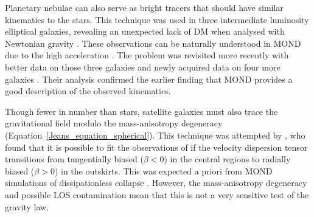 \documentclass[fleqn,usenatbib,useAMS,onecolumn]{mnras} %
\begin{document}
Planetary nebulae can also serve as bright tracers that should have similar kinematics to the stars. This technique was used in three intermediate luminosity elliptical galaxies, revealing an unexpected lack of DM when analysed with Newtonian gravity \citep{Romanowsky_2003}. These observations can be naturally understood in MOND due to the high acceleration \citep{Milgrom_2003}. The problem was revisited more recently with better data on those three galaxies and newly acquired data on four more galaxies \citep{Tian_2016}. Their analysis confirmed the earlier finding that MOND provides a good description of the observed kinematics.

Though fewer in number than stars, satellite galaxies must also trace the gravitational field modulo the mass-anisotropy degeneracy (Equation~\ref{Jeans_equation_spherical}). This technique was attempted by \citet{Angus_2008}, who found that it is possible to fit the observations of \citet{Klypin_2009_SDSS} if the velocity dispersion tensor transitions from tangentially biased ($\beta < 0$) in the central regions to radially biased ($\beta > 0$) in the outskirts. This was expected a priori from MOND simulations of dissipationless collapse \citep{Nipoti_2007_collapse}. However, the mass-anisotropy degeneracy and possible LOS contamination mean that this is not a very sensitive test of the gravity law.
\end{document}
